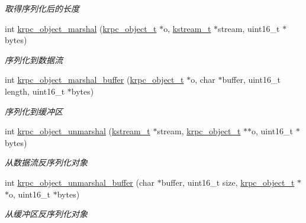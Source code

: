 \begin{DoxyCompactItemize}
\begin{DoxyCompactList}\small\item\em 取得序列化后的长度 \end{DoxyCompactList}\item 
int \hyperlink{a00110_ga77cc2dde006f9cdddf078289159bd514_ga77cc2dde006f9cdddf078289159bd514}{krpc\+\_\+object\+\_\+marshal} (\hyperlink{a00053_a9c07dfc8c3b965f75b09f82fdb1bbb1e_a9c07dfc8c3b965f75b09f82fdb1bbb1e}{krpc\+\_\+object\+\_\+t} $\ast$o, \hyperlink{a00053_acc208c4c40c875eebbfef88f00fffacf_acc208c4c40c875eebbfef88f00fffacf}{kstream\+\_\+t} $\ast$stream, uint16\+\_\+t $\ast$bytes)
\begin{DoxyCompactList}\small\item\em 序列化到数据流 \end{DoxyCompactList}\item 
int \hyperlink{a00110_ga32ed12c4faa68e258582b239b46fd180_ga32ed12c4faa68e258582b239b46fd180}{krpc\+\_\+object\+\_\+marshal\+\_\+buffer} (\hyperlink{a00053_a9c07dfc8c3b965f75b09f82fdb1bbb1e_a9c07dfc8c3b965f75b09f82fdb1bbb1e}{krpc\+\_\+object\+\_\+t} $\ast$o, char $\ast$buffer, uint16\+\_\+t length, uint16\+\_\+t $\ast$bytes)
\begin{DoxyCompactList}\small\item\em 序列化到缓冲区 \end{DoxyCompactList}\item 
int \hyperlink{a00110_ga3e61d7f696fd28c1cb4152037e4cc3c8_ga3e61d7f696fd28c1cb4152037e4cc3c8}{krpc\+\_\+object\+\_\+unmarshal} (\hyperlink{a00053_acc208c4c40c875eebbfef88f00fffacf_acc208c4c40c875eebbfef88f00fffacf}{kstream\+\_\+t} $\ast$stream, \hyperlink{a00053_a9c07dfc8c3b965f75b09f82fdb1bbb1e_a9c07dfc8c3b965f75b09f82fdb1bbb1e}{krpc\+\_\+object\+\_\+t} $\ast$$\ast$o, uint16\+\_\+t $\ast$bytes)
\begin{DoxyCompactList}\small\item\em 从数据流反序列化对象 \end{DoxyCompactList}\item 
int \hyperlink{a00110_ga0f2289e356949bc9ae0e8e0a151e42f4_ga0f2289e356949bc9ae0e8e0a151e42f4}{krpc\+\_\+object\+\_\+unmarshal\+\_\+buffer} (char $\ast$buffer, uint16\+\_\+t size, \hyperlink{a00053_a9c07dfc8c3b965f75b09f82fdb1bbb1e_a9c07dfc8c3b965f75b09f82fdb1bbb1e}{krpc\+\_\+object\+\_\+t} $\ast$$\ast$o, uint16\+\_\+t $\ast$bytes)
\begin{DoxyCompactList}\small\item\em 从缓冲区反序列化对象 \end{DoxyCompactList}\item 

\end{DoxyCompactItemize}
